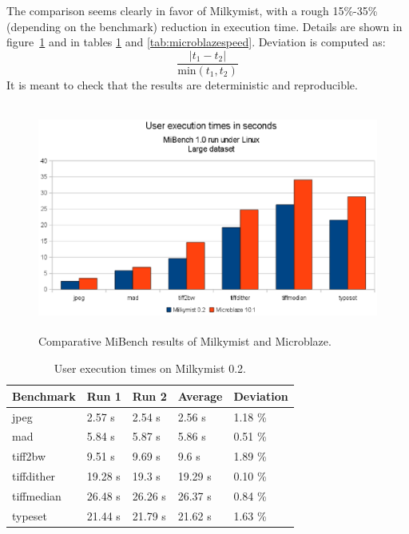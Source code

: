 \documentclass[a4paper,11pt]{kthesis}
\begin{document}
The comparison seems clearly in favor of Milkymist, with a rough 15\%-35\% (depending on the benchmark) reduction in execution time. Details are shown in figure~\ref{fig:mmvsmb} and in tables \ref{tab:milkymistspeed} and \ref{tab:microblazespeed}. Deviation is computed as:
\begin{equation}
\frac{|t_{1}-t_{2}|}{\textrm{min}(t_{1}, t_{2})}
\end{equation}
It is meant to check that the results are deterministic and reproducible.

\begin{figure}[htp]
\centering
\includegraphics[height=75mm]{mm_vs_mb.eps}
\caption{Comparative MiBench results of Milkymist and Microblaze.}
\label{fig:mmvsmb}
\end{figure}

\begin{table}
\centering
\begin{tabular}{|l|l|l|l|l|}
\hline
\textbf{Benchmark} & \textbf{Run 1} & \textbf{Run 2} & \textbf{Average} & \textbf{Deviation}  \\
\hline
jpeg & 2.57 s & 2.54 s & 2.56 s & 1.18 \% \\
\hline
mad & 5.84 s & 5.87 s & 5.86 s & 0.51 \% \\
\hline
tiff2bw & 9.51 s & 9.69 s & 9.6 s & 1.89 \% \\
\hline
tiffdither & 19.28 s & 19.3 s & 19.29 s & 0.10 \% \\
\hline
tiffmedian & 26.48 s & 26.26 s & 26.37 s & 0.84 \% \\
\hline
typeset & 21.44 s & 21.79 s & 21.62 s & 1.63 \% \\
\hline
\end{tabular}
\label{tab:milkymistspeed}
\caption{User execution times on Milkymist 0.2.}
\end{table}
\end{document}
